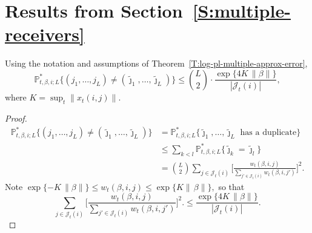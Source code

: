 \documentclass[final]{statsoc}
\newcommand{\qedhere}{}
\begin{document}
\newcommand{\multiplereceiverssection}{\ref{S:multiple-receivers}}
\section{Results from Section~\protect\multiplereceiverssection{}}
\label{S:multiple-recipient-proofs}

\begin{lemma}\label{L:coupling-prob-bound}
Using the notation and assumptions of
Theorem~\ref{T:log-pl-multiple-approx-error},
\[
    \mathbb{P}^\ast_{t,\beta,i;L}
    \Big\{
        (j_1, \ldots, j_L)
            \neq
            (\tilde \jmath_1, \ldots, \tilde \jmath_L)
    \Big\}
        \leq
        \binom{L}{2}
        \cdot
        \frac{\exp\{4 K \, \| \beta \|\}}{| \mathcal{J}_t(i) |},
\]
where $K = \sup_t \| x_t(i,j) \|$.
\end{lemma}
\begin{proof}
\begin{align*}
    \mathbb{P}^\ast_{t,\beta,i;L}
    \Big\{
        (j_1, \ldots, j_L)
            \neq
            (\tilde \jmath_1, \ldots, \tilde \jmath_L)
    \Big\}
        &=
        \mathbb{P}^\ast_{t,\beta,i;L}
        \Big\{
            \text{$\tilde \jmath_1, \ldots, \tilde \jmath_L$ has a duplicate}
        \} \\
        &\leq
        \sum_{k < l}
            \mathbb{P}^\ast_{t,\beta,i;L}
            \Big\{
                \tilde \jmath_k = \tilde \jmath_l
            \Big\} \\
        &=
            \binom{L}{2}
            \sum_{j \in \mathcal{J}_t(i)}
                \Big[
                    \frac{
                        w_t(\beta, i, j)
                    }{
                        \sum_{j' \in \mathcal{J}_t(i)} w_t(\beta, i, j')
                    }
                \Big]^2.
\end{align*}
Note
\(
    \exp\{-K \, \| \beta \|\}
        \leq w_t(\beta,i,j)
        \leq \exp\{K \| \, \beta \|\},
\)
so that
\[
    \sum_{j \in \mathcal{J}_t(i)}
        \Big[
            \frac{
                w_t(\beta, i, j)
            }{
                \sum_{j' \in \mathcal{J}_t(i)} w_t(\beta, i, j')
            }
        \Big]^2.
    \leq
        \frac{\exp\{4 K \, \| \beta \|\}}{| \mathcal{J}_t(i) |}.
    \qedhere
\]
\end{proof}
\end{document}

